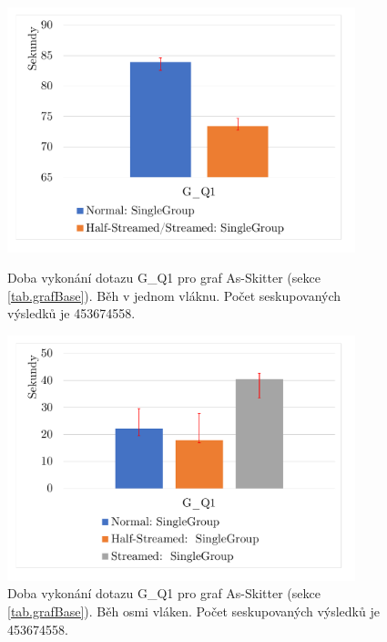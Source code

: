 \clearpage

\begin{figure}[!htp]
    \centering
    \begin{minipage}{0.45\textwidth}
        \centering
        \includegraphics[width=0.9\textwidth]{../img/skitterGroupByQ1ST.pdf} %
        \caption{Doba vykonání dotazu G\_Q1 pro graf As-Skitter (sekce \ref{tab.grafBase}). Běh v jednom vláknu. Počet seskupovaných výsledků je 453674558.}
        \label{figure.skitterGQ1ST}
    \end{minipage}\hfill
    \begin{minipage}{0.45\textwidth}
        \centering
        \includegraphics[width=0.9\textwidth]{../img/skitterGroupByQ1Par.pdf} %
        \caption{Doba vykonání dotazu G\_Q1 pro graf As-Skitter (sekce \ref{tab.grafBase}). Běh osmi vláken. Počet seskupovaných výsledků je 453674558.}
        \label{figure.skitterGQ1Par}
    \end{minipage}
\end{figure}

